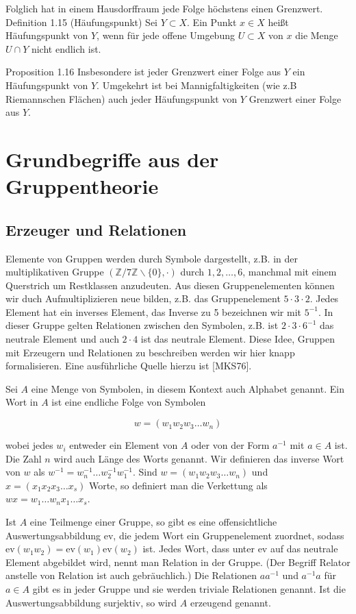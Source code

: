 \documentclass[10pt, letterpaper]{article}
\begin{document}
Folglich hat in einem Hausdorffraum jede Folge höchstens einen Grenzwert.\\
Definition 1.15 (Häufungspunkt) Sei $Y \subset X$. Ein Punkt $x \in X$ heißt Häufungspunkt von $Y$, wenn für jede offene Umgebung $U \subset X$ von $x$ die Menge $U \cap Y$ nicht endlich ist.

Proposition 1.16 Insbesondere ist jeder Grenzwert einer Folge aus $Y$ ein Häufungspunkt von $Y$. Umgekehrt ist bei Mannigfaltigkeiten (wie z.B Riemannschen Flächen) auch jeder Häufungspunkt von $Y$ Grenzwert einer Folge aus $Y$.

\section {Grundbegriffe aus der Gruppentheorie}
\subsection {Erzeuger und Relationen}
Elemente von Gruppen werden durch Symbole dargestellt, z.B. in der multiplikativen Gruppe $(\mathbb{Z} / 7 \mathbb{Z} \backslash\{0\}, \cdot)$ durch $1,2, \ldots, 6$, manchmal mit einem Querstrich um Restklassen anzudeuten. Aus diesen Gruppenelementen können wir duch Aufmultiplizieren neue bilden, z.B. das Gruppenelement $5 \cdot 3 \cdot 2$. Jedes Element hat ein inverses Element, das Inverse zu 5 bezeichnen wir mit $5^{-1}$. In dieser Gruppe gelten Relationen zwischen den Symbolen, z.B. ist $2 \cdot 3 \cdot 6^{-1}$ das neutrale Element und auch $2 \cdot 4$ ist das neutrale Element. Diese Idee, Gruppen mit Erzeugern und Relationen zu beschreiben werden wir hier knapp formalisieren. Eine ausführliche Quelle hierzu ist [MKS76].

Sei $A$ eine Menge von Symbolen, in diesem Kontext auch Alphabet genannt. Ein Wort in $A$ ist eine endliche Folge von Symbolen

$$
w=\left(w_{1} w_{2} w_{3} \ldots w_{n}\right)
$$

wobei jedes $w_{i}$ entweder ein Element von $A$ oder von der Form $a^{-1}$ mit $a \in A$ ist. Die Zahl $n$ wird auch Länge des Worts genannt. Wir definieren das inverse Wort von $w$ als $w^{-1}=w_{n}^{-1} \ldots w_{2}^{-1} w_{1}^{-1}$. Sind $w=\left(w_{1} w_{2} w_{3} \ldots w_{n}\right)$ und $x=\left(x_{1} x_{2} x_{3} \ldots x_{s}\right)$ Worte, so definiert man die Verkettung als $w x= w_{1} \ldots w_{n} x_{1} \ldots x_{s}$.

Ist $A$ eine Teilmenge einer Gruppe, so gibt es eine offensichtliche Auswertungsabbildung ev, die jedem Wort ein Gruppenelement zuordnet, sodass $\mathrm{ev}\left(w_{1} w_{2}\right)=\mathrm{ev}\left(w_{1}\right) \mathrm{ev}\left(w_{2}\right)$ ist. Jedes Wort, dass unter ev auf das neutrale Element abgebildet wird, nennt man Relation in der Gruppe. (Der Begriff Relator anstelle von Relation ist auch gebräuchlich.) Die Relationen $a a^{-1}$ und $a^{-1} a$ für $a \in A$ gibt es in jeder Gruppe und sie werden triviale Relationen genannt. Ist die Auswertungsabbildung surjektiv, so wird $A$ erzeugend genannt.
\end{document}

